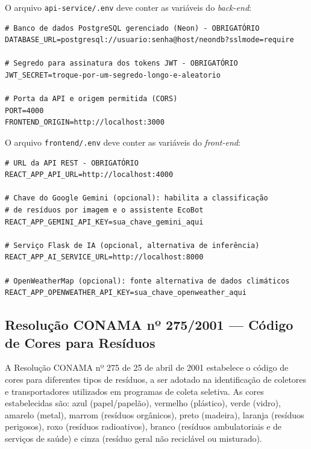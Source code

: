 \documentclass[
	12pt,
	openright,
	oneside,
	a4paper,
	chapter=TITLE,
	section=TITLE,
	subsection=TITLE,
	subsubsection=TITLE,
	english,
	brazil
	]{abntex2}
\begin{document}
\begin{apendicesenv}
O arquivo \texttt{api-service/.env} deve conter as variáveis do \textit{back-end}:

\begin{verbatim}
# Banco de dados PostgreSQL gerenciado (Neon) - OBRIGATÓRIO
DATABASE_URL=postgresql://usuario:senha@host/neondb?sslmode=require

# Segredo para assinatura dos tokens JWT - OBRIGATÓRIO
JWT_SECRET=troque-por-um-segredo-longo-e-aleatorio

# Porta da API e origem permitida (CORS)
PORT=4000
FRONTEND_ORIGIN=http://localhost:3000
\end{verbatim}

O arquivo \texttt{frontend/.env} deve conter as variáveis do \textit{front-end}:

\begin{verbatim}
# URL da API REST - OBRIGATÓRIO
REACT_APP_API_URL=http://localhost:4000

# Chave do Google Gemini (opcional): habilita a classificação
# de resíduos por imagem e o assistente EcoBot
REACT_APP_GEMINI_API_KEY=sua_chave_gemini_aqui

# Serviço Flask de IA (opcional, alternativa de inferência)
REACT_APP_AI_SERVICE_URL=http://localhost:8000

# OpenWeatherMap (opcional): fonte alternativa de dados climáticos
REACT_APP_OPENWEATHER_API_KEY=sua_chave_openweather_aqui
\end{verbatim}

\end{apendicesenv}

\begin{anexosenv}
\partanexos

\chapter{Resolução CONAMA nº 275/2001 — Código de Cores para Resíduos}

A Resolução CONAMA nº 275 de 25 de abril de 2001 estabelece o código de cores para diferentes tipos de resíduos, a ser adotado na identificação de coletores e transportadores utilizados em programas de coleta seletiva. As cores estabelecidas são: azul (papel/papelão), vermelho (plástico), verde (vidro), amarelo (metal), marrom (resíduos orgânicos), preto (madeira), laranja (resíduos perigosos), roxo (resíduos radioativos), branco (resíduos ambulatoriais e de serviços de saúde) e cinza (resíduo geral não reciclável ou misturado).

\end{anexosenv}
\end{document}
